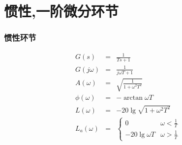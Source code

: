 \documentclass[table]{beamer}
\begin{document}
\section{惯性,一阶微分环节}
\label{sec-2}
\begin{frame}
\frametitle{惯性环节}
\label{sec-2-1}

\begin{eqnarray*}
G(s) & = & \frac{1}{Ts+1}\\
G(j\omega) & =& \frac{1}{j\omega T+1}\\
A(\omega) &=& \sqrt{\frac{1}{1+\omega^2 T^2}}\\
\phi(\omega) &=& -\arctan{\omega T} \\
L(\omega)&=& -20\lg\sqrt{1+\omega^2 T^2}\\
L_a(\omega)&=& \begin{cases} 0 & \omega<\frac{1}{T} \\  -20\lg\omega T & \omega>\frac{1}{T}\end{cases}
\end{eqnarray*}
\end{frame}
\end{document}
